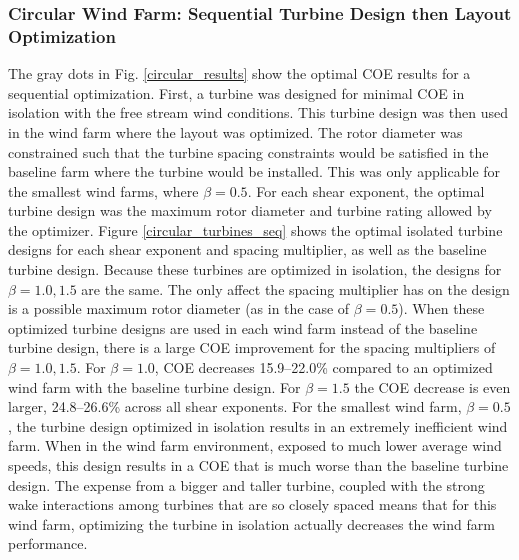 \subsubsection{Circular Wind Farm: Sequential Turbine Design then Layout Optimization}
The gray dots in Fig. \ref{circular_results} show the optimal COE results for a sequential optimization. First, a turbine was designed for minimal COE in isolation with the free stream wind conditions. This turbine design was then used in the wind farm where the layout was optimized. 
The rotor diameter was constrained such that the turbine spacing constraints would be satisfied in the baseline farm where the turbine would be installed. This was only applicable for the smallest wind farms, where $\beta=0.5$. 
For each shear exponent, the optimal turbine design was the maximum rotor diameter and turbine rating allowed by the optimizer.
Figure \ref{circular_turbines_seq} shows the optimal isolated turbine designs for each shear exponent and spacing multiplier, as well as the baseline turbine design. Because these turbines are optimized in isolation, the designs for $\beta=1.0,1.5$ are the same. The only affect the spacing multiplier has on the design is a possible maximum rotor diameter (as in the case of $\beta=0.5$).
When these optimized turbine designs are used in each wind farm instead of the baseline turbine design, there is a large COE improvement for the spacing multipliers of $\beta=1.0, 1.5$. For $\beta=1.0$, COE decreases 15.9--22.0\% compared to an optimized wind farm with the baseline turbine design. For $\beta=1.5$ the COE decrease is even larger, 24.8--26.6\% across all shear exponents. 
For the smallest wind farm, $\beta=0.5$, the turbine design optimized in isolation results in an extremely inefficient wind farm. When in the wind farm environment, exposed to much lower average wind speeds, this design results in a COE that is much worse than the baseline turbine design. The expense from a bigger and taller turbine, coupled with the strong wake interactions among turbines that are so closely spaced means that for this wind farm, optimizing the turbine in isolation actually decreases the wind farm performance. 


